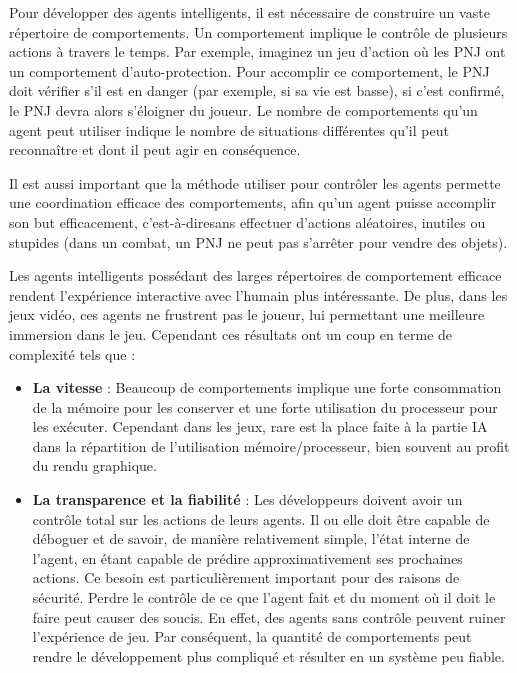 \documentclass[a4paper, 12pt]{article} %
\begin{document}
Pour développer des agents intelligents, il est nécessaire de construire un vaste répertoire de comportements. Un comportement implique le contrôle de plusieurs actions à travers le temps. Par exemple, imaginez un jeu d’action où les PNJ ont un comportement d’auto-protection. Pour accomplir ce comportement, le PNJ doit vérifier s’il est en danger (par exemple, si sa vie est basse), si c’est confirmé, le PNJ devra alors s’éloigner du joueur. Le nombre de comportements qu’un agent peut utiliser indique le nombre de situations différentes qu’il peut reconnaître et dont il peut agir en conséquence.

Il est aussi important que la méthode utiliser pour contrôler les agents permette une coordination efficace des comportements, afin qu’un agent puisse accomplir son but efficacement, c’est-à-diresans effectuer d’actions aléatoires, inutiles ou stupides (dans un combat, un PNJ ne peut pas s’arrêter pour vendre des objets).

Les agents intelligents possédant des larges répertoires de comportement efficace rendent l’expérience interactive avec l’humain plus intéressante. De plus, dans les jeux vidéo, ces agents ne frustrent pas le joueur, lui permettant une meilleure immersion dans le jeu. Cependant ces résultats ont un coup en terme de complexité tels que :

\begin{itemize}
	\item \textbf{La vitesse} : Beaucoup de comportements implique une forte consommation de la mémoire pour les conserver et une forte utilisation du processeur pour les exécuter. Cependant dans les jeux, rare est la place faite à la partie IA dans la répartition de l’utilisation mémoire/processeur, bien souvent au profit du rendu graphique.
	\item \textbf{La transparence et la fiabilité} : Les développeurs doivent avoir un contrôle total sur les actions de leurs agents. Il ou elle doit être capable de déboguer et de savoir, de manière relativement simple, l’état interne de l’agent, en étant capable de prédire approximativement ses prochaines actions. Ce besoin est particulièrement important pour des raisons de sécurité. Perdre le contrôle de ce que l’agent fait et du moment où il doit le faire peut causer des soucis. En effet, des agents sans contrôle peuvent ruiner l’expérience de jeu. Par conséquent, la quantité de comportements peut rendre le développement plus compliqué et résulter en un système peu fiable.
\end{itemize}
\end{document}

